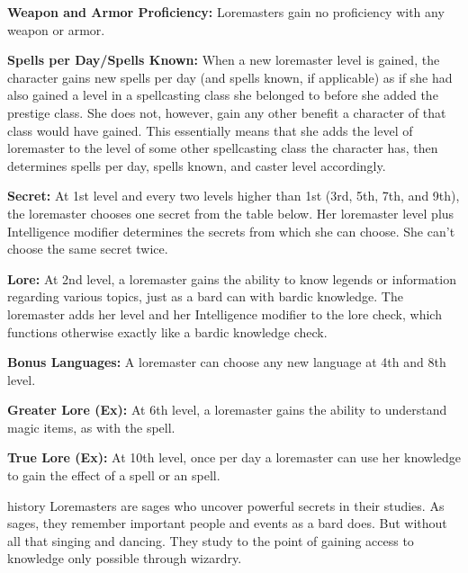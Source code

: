 {
\textbf{Weapon and Armor Proficiency:} Loremasters gain no proficiency with any weapon or armor.

\textbf{Spells per Day/Spells Known:} When a new loremaster level is gained, the character gains new spells per day (and spells known, if applicable) as if she had also gained a level in a spellcasting class she belonged to before she added the prestige class. She does not, however, gain any other benefit a character of that class would have gained. This essentially means that she adds the level of loremaster to the level of some other spellcasting class the character has, then determines spells per day, spells known, and caster level accordingly.

\textbf{Secret:} At 1st level and every two levels higher than 1st (3rd, 5th, 7th, and 9th), the loremaster chooses one secret from the table below. Her loremaster level plus Intelligence modifier determines the secrets from which she can choose. She can’t choose the same secret twice.


\textbf{Lore:} At 2nd level, a loremaster gains the ability to know legends or information regarding various topics, just as a bard can with bardic knowledge. The loremaster adds her level and her Intelligence modifier to the lore check, which functions otherwise exactly like a bardic knowledge check.

\textbf{Bonus Languages:} A loremaster can choose any new language at 4th and 8th level.

\textbf{Greater Lore (Ex):} At 6th level, a loremaster gains the ability to understand magic items, as with the  spell.

\textbf{True Lore (Ex):} At 10th level, once per day a loremaster can use her knowledge to gain the effect of a  spell or an  spell.
}
{}
{history}
{Loremasters are sages who uncover powerful secrets in their studies.}
{As sages, they remember important people and events as a bard does. But without all that singing and dancing.}
{They study to the point of gaining access to knowledge only possible through wizardry.}